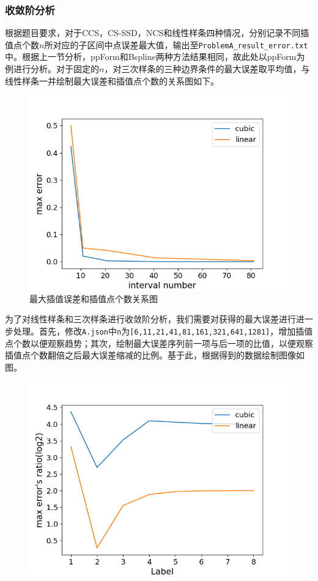\documentclass{ctexart}
\begin{document}
\begin{sloppypar}
\subsubsection{收敛阶分析}
根据题目要求，对于CCS，CS-SSD，NCS和线性样条四种情况，分别记录不同插值点个数$n$所对应的子区间中点误差最大值，输出至\verb|ProblemA_result_error.txt|中。根据上一节分析，ppForm和Bspline两种方法结果相同，故此处以ppForm为例进行分析。对于固定的$n$，对三次样条的三种边界条件的最大误差取平均值，与线性样条一并绘制最大误差和插值点个数的关系图如下。
\begin{figure}[H]
\centering
\includegraphics[scale = 0.5]{fig//ProblemA_maxerror.png}
\caption{最大插值误差和插值点个数关系图}
\label{fig6}
\end{figure}
为了对线性样条和三次样条进行收敛阶分析，我们需要对获得的最大误差进行进一步处理。首先，修改\verb|A.json|中\verb|n|为\verb|[6,11,21,41,81,161,321,641,1281]|，增加插值点个数以便观察趋势；其次，绘制最大误差序列前一项与后一项的比值，以便观察插值点个数翻倍之后最大误差缩减的比例。基于此，根据得到的数据绘制图像如图。
\begin{figure}[H]
\centering
\includegraphics[scale = 0.5]{fig//ProblemA_maxerror_ratio.png}

\end{figure}
\end{sloppypar}
\end{document}
